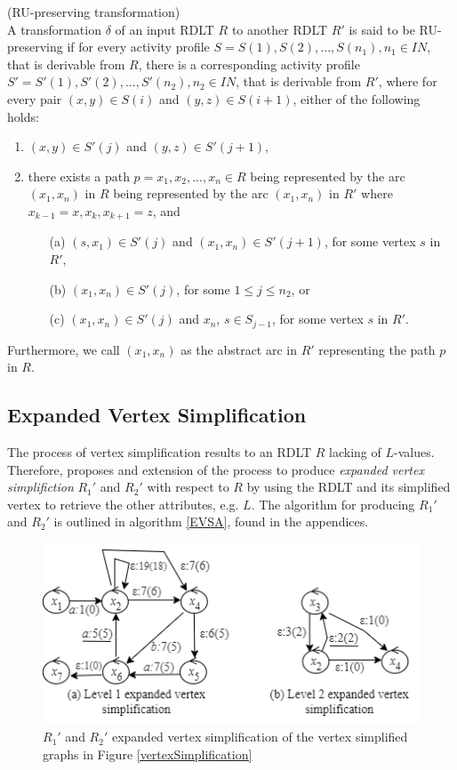 \begin{defn} (RU-preserving transformation) \\
    A transformation $\delta$ of an input RDLT $R$ to another RDLT $R'$ is said to be RU-preserving if for every activity profile $S = {S(1), S(2), ..., S(n_1)}, n_1 \in IN$, that is derivable from $R$, there is a corresponding activity profile $S' = {S'(1), S'(2), ..., S'(n_2)}, n_2 \in IN$, that is derivable from $R'$, where for every pair $(x,y) \in S(i)$ and $(y,z) \in S(i+1)$, either of the following holds:
    \begin{enumerate}
        \item $(x,y) \in S'(j)$ and $(y,z) \in S'(j+1)$,
        \item there exists a path $p=x_1, x_2, ..., x_n \in R$ being represented by the arc $(x_1, x_n)$ in $R$ being represented by the arc $(x_1, x_n)$ in $R'$ where $x_{k-1}=x,x_k, x_{k+1}=z$, and
            \begin{itemize}
                \item[(a)] $(s,x_1) \in S'(j)$ and $(x_1,x_n) \in S'(j+1)$, for some vertex $s$ in $R'$,
                \item[(b)] $(x_1,x_n) \in S'(j)$, for some $1 \leq j \leq n_2$, or
                \item[(c)] $(x_1,x_n) \in S'(j)$ and $x_n$, $s \in S_{j-1}$, for some vertex $s$ in $R'$.
            \end{itemize}
    \end{enumerate}
    Furthermore, we call $(x_1,x_n)$ as the abstract arc in $R'$ representing the path $p$ in $R$.
\end{defn}
\subsection*{Expanded Vertex Simplification}
The process of vertex simplification results to an RDLT $R$ lacking of $L$-values. Therefore, \cite{MalinaoWCTP2023} proposes and extension of the process to produce \emph{expanded vertex simplifiction} $R_1'$ and $R_2'$ with respect to $R$ by using the RDLT and its simplified vertex to retrieve the other attributes, e.g. $L$. The algorithm for producing $R_1'$ and $R_2'$ is outlined in algorithm \ref{EVSA}, found in the appendices.

\begin{figure}[H]
    \centering
    \includegraphics{../figures/expandedVertexSimplification.png}
    \caption{$R_1'$ and $R_2'$ expanded vertex simplification of the vertex simplified graphs in Figure \ref{vertexSimplification}}
    \label{expandedVertexSimplifiedRLDTs}
\end{figure}


